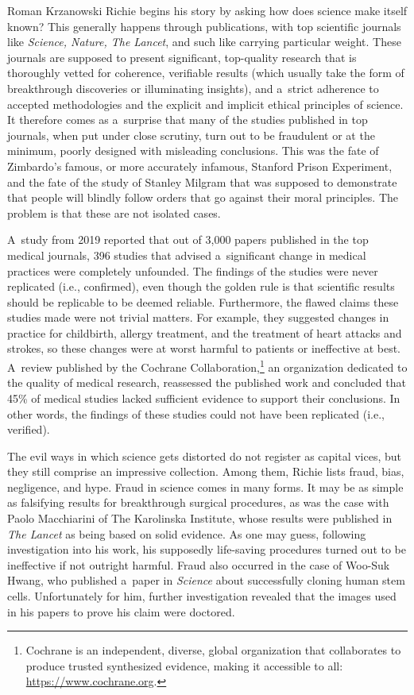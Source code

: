 \begin{newrevengenv}{Roman Krzanowski}
Richie begins his story by asking how does science make itself known? This generally happens through publications, with top scientific journals like \textit{Science, Nature, The Lancet}, and such like carrying particular weight. These journals are supposed to present significant, top-quality research that is thoroughly vetted for coherence, verifiable results (which usually take the form of breakthrough discoveries or illuminating insights), and a~strict adherence to accepted methodologies and the explicit and implicit ethical principles of science. It therefore comes as a~surprise that many of the studies published in top journals, when put under close scrutiny, turn out to be fraudulent or at the minimum, poorly designed with misleading conclusions. This was the fate of Zimbardo's famous, or more accurately infamous, Stanford Prison Experiment, and the fate of the study of Stanley Milgram that was supposed to demonstrate that people will blindly follow orders that go against their moral principles. The problem is that these are not isolated cases.

A~study from 2019 reported that out of 3,000 papers published in the top medical journals, 396 studies that advised a~significant change in medical practices were completely unfounded. The findings of the studies were never replicated (i.e., confirmed), even though the golden rule is that scientific results should be replicable to be deemed reliable. Furthermore, the flawed claims these studies made were not trivial matters. For example, they suggested changes in practice for childbirth, allergy treatment, and the treatment of heart attacks and strokes, so these changes were at worst harmful to patients or ineffective at best. A~review published by the Cochrane Collaboration,\footnote{Cochrane is an independent, diverse, global organization that collaborates to produce trusted synthesized evidence, making it accessible to all: \url{https://www.cochrane.org}.} an organization dedicated to the quality of medical research, reassessed the published work and concluded that 45\% of medical studies lacked sufficient evidence to support their conclusions. In other words, the findings of these studies could not have been replicated (i.e., verified).

The evil ways in which science gets distorted do not register as capital vices, but they still comprise an impressive collection. Among them, Richie lists fraud, bias, negligence, and hype. Fraud in science comes in many forms. It may be as simple as falsifying results for breakthrough surgical procedures, as was the case with Paolo Macchiarini of The Karolinska Institute, whose results were published in \textit{The Lancet} as being based on solid evidence. As one may guess, following investigation into his work, his supposedly life-saving procedures turned out to be ineffective if not outright harmful. Fraud also occurred in the case of Woo-Suk Hwang, who published a~paper in \textit{Science} about successfully cloning human stem cells. Unfortunately for him, further investigation revealed that the images used in his papers to prove his claim were doctored.


\end{newrevengenv}
